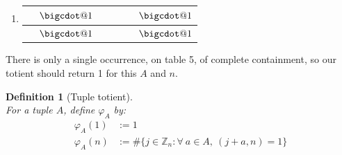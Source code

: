 \documentclass[11pt, leqno]{article}
\makeatletter
\newtheorem{definition}[theorem]{Definition}
\newcommand*\bigcdot{\mathpalette\bigcdot@{1}}
\newcommand*\bigcdot@[2]{\mathbin{\vcenter{\hbox{\scalebox{#2}{$\m@th#1\bullet$}}}}}
\makeatother
\begin{document}
\begin{enumerate}
\begin{center}
\begin{tabular}{ |c|c|c|c|c|c| }
        \hline
    \end{tabular} \end{center}
    \item[5] \begin{center} \begin{tabular}{ |c|c|c|c|c|c| } 
        \hline
        $ $ & $\bigcdot $ & $ $ & $ $ & $ $ & $\bigcdot$\\
        \hline
        $\ $ & $\bigcdot$ & $\ $ & $\ $ & $\ $ & $\bigcdot$\\
        \hline
    \end{tabular} \end{center}
\end{enumerate}

There is only a single occurrence, on table 5, of complete containment,
so our totient should return 1 for this $A$ and $n$.

\begin{definition}[Tuple totient]~ \\
    For a tuple $A$, define $\varphi_A$ by:
    \begin{align*}
        \varphi_A(1) &:= 1 \\
        \varphi_A(n) &:= \#\{j\in\mathbb{Z}_n : 
            \forall\ a \in A,\ (j+a,n)=1 \}
    \end{align*}
\end{definition}
\end{document}
